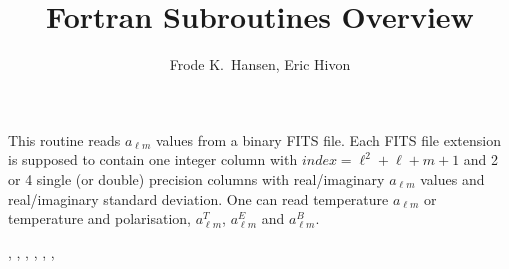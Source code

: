 
\sloppy


\title{\healpix Fortran Subroutines Overview}
 \section[fits2alms*]{ }
\label{sub:fits2alms}
\author{Frode K.~Hansen, Eric Hivon}

\begin{facility}
{This routine reads  $a_{\ell m}$  values from a binary FITS file. Each FITS file
  extension is supposed to contain one integer column with
  $index=\ell^2+\ell+m+1$  and 2 or 4 single (or double) precision columns 
with real/imaginary  $a_{\ell m}$  values and real/imaginary   standard deviation. 
One can read temperature $a_{\ell m}$ or temperature and polarisation, $a^T_{\ell m}$, $a^E_{\ell m}$ and $a^B_{\ell m}$.}
{\modFitstools}
\end{facility}

\begin{f90format}
{%
, %
, %
, %
, %
, %
, %
}
\end{f90format}


